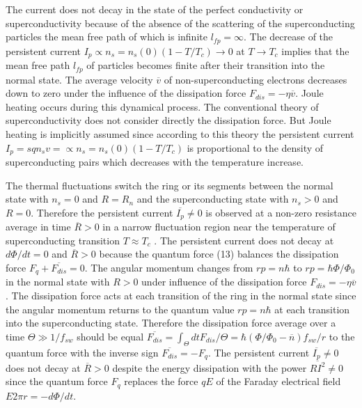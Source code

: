 \documentclass[twocolumn,secnumarabic,amssymb, nobibnotes, aps, prd]{revtex4}
\begin{document}
The current does not decay in the state of the perfect conductivity or superconductivity because of the absence of the scattering of the superconducting particles the mean free path of which is infinite $l_{fp} = \infty $. The decrease of the persistent current $I_{p} \propto n_{s} = n_{s}(0)(1-T/T_{c}) \rightarrow 0$ at $T \rightarrow T_{c}$ implies that the mean free path $l_{fp}$ of particles becomes finite after their transition into the normal state. The average velocity $\overline{v}$ of non-superconducting electrons decreases down to zero under the influence of the dissipation force $F_{dis} = -\eta \overline{v}$. Joule heating occurs during this dynamical process. The conventional theory of superconductivity \cite{GL1950} does not consider directly the dissipation force. But Joule heating is implicitly assumed since according to this theory the persistent current $I_{p} = sqn_{s}v =  \propto n_{s} = n_{s}(0)(1-T/T_{c})$ is proportional to the density of superconducting pairs which decreases with the temperature increase.  

The thermal fluctuations \cite{Tink75} switch the ring or its segments between the normal state with $n_{s} = 0$ and $R = R_{n}$ and the superconducting state with $n_{s} > 0$ and $R = 0$. Therefore the persistent current $\overline{I_{p}} \neq 0$ is observed at a non-zero resistance average in time $\overline{R} > 0$ in a narrow fluctuation region near the temperature of superconducting transition $T \approx T_{c}$ \cite{LP1962,Letter2007,PC2007}. The persistent current does not decay at $d\Phi /dt = 0$ and $\overline{R} > 0$ because the quantum force (13) balances the dissipation force $F_{q} + \overline{F_{dis}} = 0$. The angular momentum changes from $rp = n\hbar $ to $rp = \hbar \Phi /\Phi _{0}$ in the normal state with $R > 0$ under influence of the dissipation force $F_{dis} = -\eta \overline{v}$. The dissipation force acts at each transition of the ring in the normal state since the angular momentum returns to the quantum value $rp = n\hbar $ at each transition into the superconducting state. Therefore the dissipation force average over a time $\Theta \gg 1/f _{sw}$ should be equal $\overline{F_{dis}} = \int_{\Theta} dt F_{dis}/\Theta = \hbar (\Phi /\Phi_{0}- \overline{n})f_{sw}/r $ to the quantum force with the inverse sign $\overline{F_{dis}} = - F_{q}$. The persistent current $\overline{I_{p}} \neq 0$ does not decay at $\overline{R} > 0$ \cite{Letter2007,LP1962,PC2007} despite the energy dissipation with the power $\overline{RI^{2}} \neq 0$ since the quantum force $F_{q}$ replaces the force $qE$ of the Faraday electrical field $E 2\pi r = -d\Phi /dt $. 
\end{document}
